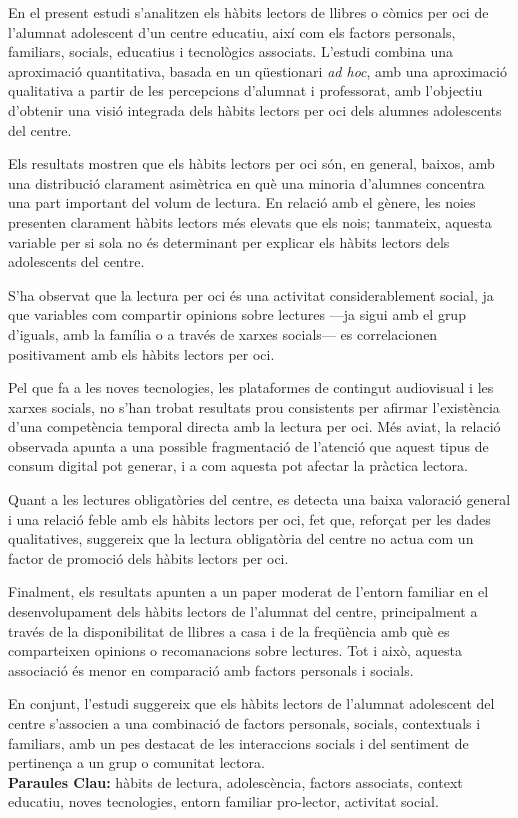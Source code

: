 \documentclass[12pt]{article}
\begin{document}
En el present estudi s’analitzen els hàbits lectors de llibres o còmics per oci de l’alumnat adolescent d’un centre educatiu, així com els factors personals, familiars, socials, educatius i tecnològics associats. L’estudi combina una aproximació quantitativa, basada en un qüestionari \emph{ad hoc}, amb una aproximació qualitativa a partir de les percepcions d’alumnat i professorat, amb l’objectiu d’obtenir una visió integrada dels hàbits lectors per oci dels alumnes adolescents del centre.

Els resultats mostren que els hàbits lectors per oci són, en general, baixos, amb una distribució clarament asimètrica en què una minoria d’alumnes concentra una part important del volum de lectura. En relació amb el gènere, les noies presenten clarament hàbits lectors més elevats que els nois; tanmateix, aquesta variable per si sola no és determinant per explicar els hàbits lectors dels adolescents del centre.

S’ha observat que la lectura per oci és una activitat considerablement social, ja que variables com compartir opinions sobre lectures —ja sigui amb el grup d’iguals, amb la família o a través de xarxes socials— es correlacionen positivament amb els hàbits lectors per oci.

Pel que fa a les noves tecnologies, les plataformes de contingut audiovisual i les xarxes socials, no s’han trobat resultats prou consistents per afirmar l’existència d’una competència temporal directa amb la lectura per oci. Més aviat, la relació observada apunta a una possible fragmentació de l’atenció que aquest tipus de consum digital pot generar, i a com aquesta pot afectar la pràctica lectora.

Quant a les lectures obligatòries del centre, es detecta una baixa valoració general i una relació feble amb els hàbits lectors per oci, fet que, reforçat per les dades qualitatives, suggereix que la lectura obligatòria del centre no actua com un factor de promoció dels hàbits lectors per oci. 

Finalment, els resultats apunten a un paper moderat de l’entorn familiar en el desenvolupament dels hàbits lectors de l’alumnat del centre, principalment a través de la disponibilitat de llibres a casa i de la freqüència amb què es comparteixen opinions o recomanacions sobre lectures. Tot i això, aquesta associació és menor en comparació amb factors personals i socials.

En conjunt, l’estudi suggereix que els hàbits lectors de l’alumnat adolescent del centre s’associen a una combinació de factors personals, socials, contextuals i familiars, amb un pes destacat de les interaccions socials i del sentiment de pertinença a un grup o comunitat lectora.
\\[4ex]
\textbf{Paraules Clau:} hàbits de lectura, adolescència, factors associats, context educatiu, noves tecnologies, entorn familiar pro-lector, activitat social.
\end{document}
